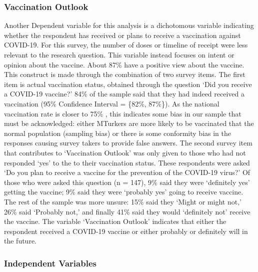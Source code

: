 \hypertarget{vaccination-outlook}{\subsubsection{Vaccination Outlook}\label{vaccination-outlook}}



Another Dependent variable for this analysis is a dichotomous variable
indicating whether the respondent has received or plans to receive a vaccination
against COVID-19. For this survey, the number of doses or timeline of receipt
were less relevant to the research question. This variable instead focuses on
intent or opinion about the vaccine. About 87\% have a positive view about the
vaccine. This construct is made through the combination of two survey items. The
first item is actual vaccination status, obtained through the question `Did you
receive a COVID-19 vaccine?' 84\% of the sample said that they had indeed
received a vaccination (95\% Confidence Interval = \{82\%, 87\%\}). As the
national vaccination rate is closer to 75\% \citep{cdc20}, this indicates some
bias in our sample that must be acknowledged: either MTurkers are more likely to
be vaccinated that the normal population (sampling bias) or there is some
conformity bias in the responses causing survey takers to provide false answers.
The second survey item that contributes to `Vaccination Outlook' was only given
to those who had not responded `yes' to the to their vaccination status. These
respondents were asked `Do you plan to receive a vaccine for the prevention of
the COVID-19 virus?' Of those who were asked this question (n = 147), 9\% said
they were `definitely yes' getting the vaccine; 9\% said they were `probably
yes' going to receive vaccine. The rest of the sample was more unsure: 15\% said
they `Might or might not,' 26\% said `Probably not,' and finally 41\% said they
would `definitely not' receive the vaccine. The variable `Vaccination Outlook'
indicates that either the respondent received a COVID-19 vaccine or either
probably or definitely will in the future.

\hypertarget{independent-variables}{%
\subsubsection{Independent Variables}\label{independent-variables}}

